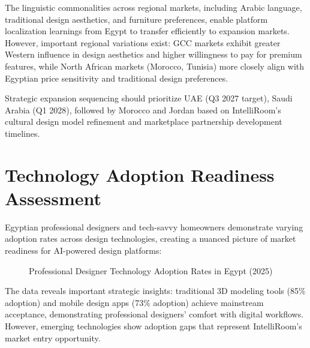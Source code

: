 The linguistic commonalities across regional markets, including Arabic language, traditional design aesthetics, and furniture preferences, enable platform localization learnings from Egypt to transfer efficiently to expansion markets. However, important regional variations exist: GCC markets exhibit greater Western influence in design aesthetics and higher willingness to pay for premium features, while North African markets (Morocco, Tunisia) more closely align with Egyptian price sensitivity and traditional design preferences.

Strategic expansion sequencing should prioritize UAE (Q3 2027 target), Saudi Arabia (Q1 2028), followed by Morocco and Jordan based on IntelliRoom's cultural design model refinement and marketplace partnership development timelines.

\section{Technology Adoption Readiness Assessment}
\label{sec:app_tech_adoption}

Egyptian professional designers and tech-savvy homeowners demonstrate varying adoption rates across design technologies, creating a nuanced picture of market readiness for AI-powered design platforms:

\begin{figure}[htbp]
\centering
{}
\caption{Professional Designer Technology Adoption Rates in Egypt (2025)}
\label{fig:tech_adoption}
\end{figure}

The data reveals important strategic insights: traditional 3D modeling tools (85\% adoption) and mobile design apps (73\% adoption) achieve mainstream acceptance, demonstrating professional designers' comfort with digital workflows. However, emerging technologies show adoption gaps that represent IntelliRoom's market entry opportunity.

